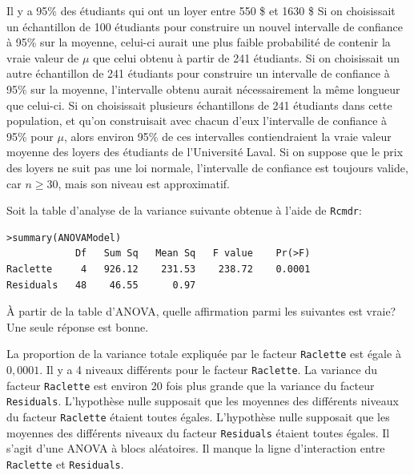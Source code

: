 \begin{questions}
\begin{checkboxes}
\choice Il y a 95\% des étudiants qui ont un loyer entre 550 \$ et 1630 \$
\choice Si on choisissait un échantillon de 100 étudiants pour construire un nouvel intervalle de confiance à 95\% sur la moyenne, celui-ci aurait une plus faible probabilité de contenir la vraie valeur de $\mu$ que celui obtenu à partir de 241 étudiants.
\choice Si on choisissait un autre échantillon de 241 étudiants pour construire un intervalle de confiance à 95\% sur la moyenne, l'intervalle obtenu aurait nécessairement la même longueur que celui-ci.
\correctchoice Si on choisissait plusieurs échantillons de 241 étudiants dans cette population, et qu'on construisait avec chacun d'eux l'intervalle de confiance à 95\% pour $\mu$, alors environ 95\% de ces intervalles contiendraient la vraie valeur moyenne des loyers des étudiants de l'Université Laval. 
\correctchoice Si on suppose que le prix des loyers ne suit pas une loi normale, l'intervalle de confiance est toujours valide, car $n\geq 30$, mais son niveau est approximatif.
\end{checkboxes}


\newpage

\question[3] Soit la table d'analyse de la variance suivante obtenue à l'aide de \texttt{Rcmdr}:
\begin{verbatim}
>summary(ANOVAModel)
            Df   Sum Sq   Mean Sq   F value    Pr(>F)    
Raclette     4   926.12    231.53    238.72    0.0001 
Residuals   48    46.55      0.97                      
\end{verbatim}

À partir de la table d'ANOVA, quelle affirmation parmi les suivantes est vraie? Une seule réponse est bonne.

\begin{checkboxes}
\choice La proportion de la variance totale expliquée par le facteur \texttt{Raclette} est égale à $0,0001$. 
\choice Il y a 4 niveaux différents pour le facteur \texttt{Raclette}.
\choice La variance du facteur \texttt{Raclette} est environ 20 fois plus grande que la variance du facteur \texttt{Residuals}.
\correctchoice L'hypothèse nulle supposait que les moyennes des différents niveaux du facteur \texttt{Raclette} étaient toutes égales.
\choice L'hypothèse nulle supposait que les moyennes des différents niveaux du facteur \texttt{Residuals} étaient toutes égales.
\choice Il s'agit d'une ANOVA à blocs aléatoires.
\choice Il manque la ligne d'interaction entre \texttt{Raclette} et \texttt{Residuals}.
\end{checkboxes}


\end{questions}
